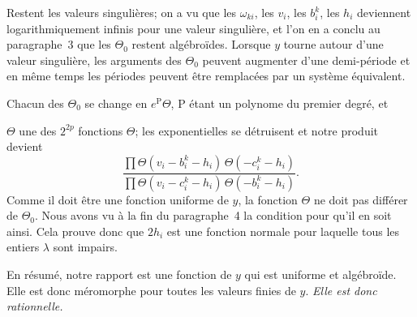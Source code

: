 \documentclass{article}
\begin{document}
Restent les valeurs singulières; on a vu que les $\omega_{ki}$, les $v_{i}$, les $b_{i}^{k}$, les $h_{i}$ deviennent logarithmiquement infinis pour une valeur singulière, et l'on en a conclu au paragraphe~3 que les $\Theta_{0}$ restent algébroïdes. Lorsque $y$ tourne autour d'une valeur singulière, les arguments des $\Theta_{0}$ peuvent augmenter d'une demi-période et en même temps les périodes peuvent être remplacées par un système équivalent.

Chacun des $\Theta_{0}$ se change en $e^{\mathrm{P}}\Theta$, $\mathrm{P}$ étant un polynome du premier degré, et

$\Theta$ une des $2^{2p}$ fonctions $\Theta$; les exponentielles se détruisent et notre produit devient
\[
\frac{\prod \Theta(v_{i} - b_{i}^{k} - h_{i})\,\Theta(- c_{i}^{k} - h_{i})}{\prod \Theta(v_{i} - c_{i}^{k} - h_{i})\,\Theta(- b_{i}^{k} - h_{i})}.
\]
Comme il doit être une fonction uniforme de $y$, la fonction $\Theta$ ne doit pas différer de $\Theta_{0}$. Nous avons vu à la fin du paragraphe~4 la condition pour qu'il en soit ainsi. Cela prouve donc que $2h_{i}$ est une fonction normale pour laquelle tous les entiers $\lambda$ sont impairs.

En résumé, notre rapport est une fonction de $y$ qui est uniforme et algébroïde. Elle est donc méromorphe pour toutes les valeurs finies de $y$. \emph{Elle est donc rationnelle.}
\end{document}
